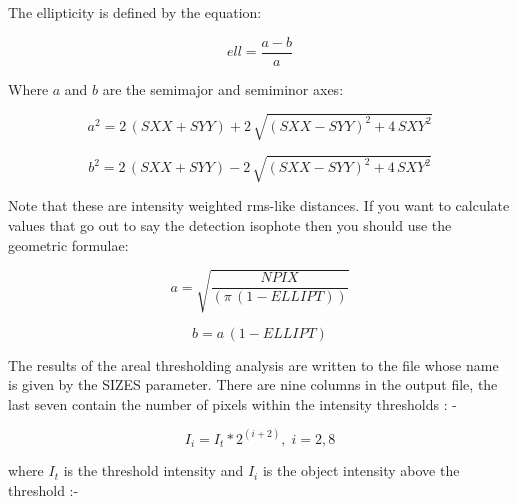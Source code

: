 The ellipticity is defined by the equation:
\begin{center}
\begin{displaymath}
ell = \frac{a-b}{a}
\end{displaymath}
\end{center}
Where $a$ and $b$ are the semimajor and semiminor axes:
\begin{center}
\begin{displaymath}
a^{2} = 2\,(SXX + SYY) +2\,\sqrt{(SXX - SYY)^{2} +4\,SXY^{2}}
\end{displaymath}
\end{center}
\begin{center}
\begin{displaymath}
b^{2} = 2\,(SXX + SYY) -2\,\sqrt{(SXX - SYY)^{2} +4\,SXY^{2}}
\end{displaymath}
\end{center}
Note that these are intensity weighted rms-like distances. If you 
want to calculate values that go out to say the detection isophote
then you should use the geometric formulae:
\begin{center}
\begin{displaymath}
a = \sqrt{\frac{NPIX}{(\pi\,(1-ELLIPT))}}
\end{displaymath}
\end{center}
\begin{center}
\begin{displaymath}
b = a\,(1-ELLIPT)
\end{displaymath}
\end{center}

The results of the areal thresholding analysis are written to the
file whose name is given by the SIZES parameter.  There are nine
columns in the output file, the last seven contain the number of pixels
within the intensity thresholds : -
\begin{center}
\begin{displaymath}
 I_{i} = I_{t} * 2^{(i+2)},\; i=2,8
\end{displaymath}
\end{center}
where $I_{t}$ is the threshold intensity and $I_{i}$ is the object
intensity above the threshold :-

